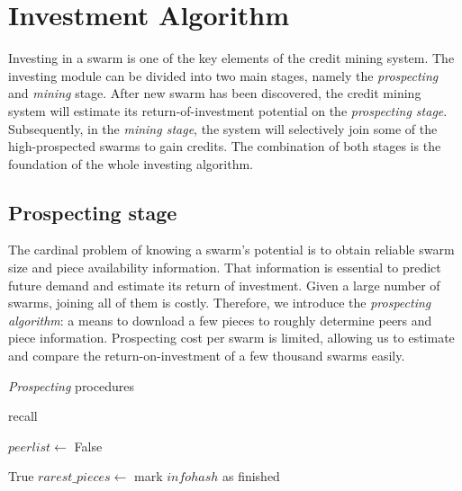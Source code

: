 \chapter{Investment Algorithm}
\label{chapter:prospection}
Investing in a swarm is one of the key elements of the credit mining system. The investing module can be divided into two main stages, namely the \textit{prospecting} and \textit{mining} stage. After new swarm has been discovered, the credit mining system will estimate its return-of-investment potential on the \textit{prospecting stage}. Subsequently, in the \textit{mining stage}, the system will selectively join some of the high-prospected swarms to gain credits. The combination of both stages is the foundation of the whole investing algorithm. 

\section{Prospecting stage}
The cardinal problem of knowing a swarm's potential is to obtain reliable swarm size and piece availability information. That information is essential to predict future demand and estimate its return of investment. Given a large number of swarms, joining all of them is costly. Therefore, we introduce the \textit{prospecting algorithm}: a means to download a few pieces to roughly determine peers and piece information. Prospecting cost per swarm is limited, allowing us to estimate and compare the return-on-investment of a few thousand swarms easily.

\begin{algorithm}[h!]
	\caption{\textit{Prospecting} procedures}
	\label{alg:prospectg}
	\begin{algorithmic}[1]
		\State recall 
		\EndIf
		\State {}
		\State {}
		\State {}
		\State \Return {}
		\EndFunction
		
		\Statex
		\State $peerlist \gets$ 
		\State {}
		\State {}
		\State \Return False
		\EndIf
		
		\State {}
		\State \Return True
		\EndIf
		\State $rarest\_pieces \gets$  \label{alg:prospectg:callrarepc}
			\State {}
		\EndFor
		\State mark $infohash$ as finished
		\EndIf
		\State \Return {}
		\EndFunction		
	\end{algorithmic}
\end{algorithm}

